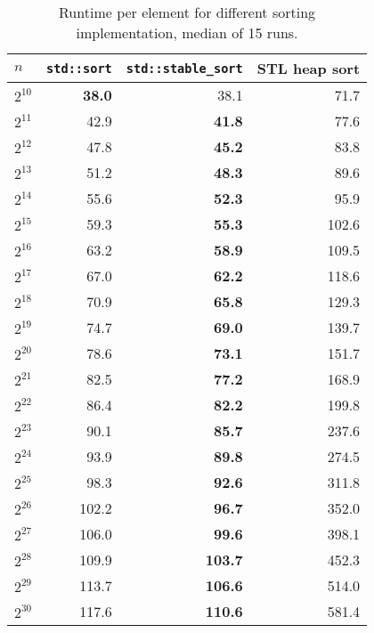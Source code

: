 \documentclass{article}
\begin{document}
\begin{table}\centering
\begin{tabular}{l|rrr}
$n$ & \texttt{std::sort} & \texttt{std::stable\_sort} & STL heap sort \\ \hline
$2^{10}$ & \bf 38.0 &      38.1 &  71.7 \\
$2^{11}$ &     42.9 &  \bf 41.8 &  77.6 \\
$2^{12}$ &     47.8 &  \bf 45.2 &  83.8 \\
$2^{13}$ &     51.2 &  \bf 48.3 &  89.6 \\
$2^{14}$ &     55.6 &  \bf 52.3 &  95.9 \\
$2^{15}$ &     59.3 &  \bf 55.3 & 102.6 \\
$2^{16}$ &     63.2 &  \bf 58.9 & 109.5 \\
$2^{17}$ &     67.0 &  \bf 62.2 & 118.6 \\
$2^{18}$ &     70.9 &  \bf 65.8 & 129.3 \\
$2^{19}$ &     74.7 &  \bf 69.0 & 139.7 \\
$2^{20}$ &     78.6 &  \bf 73.1 & 151.7 \\
$2^{21}$ &     82.5 &  \bf 77.2 & 168.9 \\
$2^{22}$ &     86.4 &  \bf 82.2 & 199.8 \\
$2^{23}$ &     90.1 &  \bf 85.7 & 237.6 \\
$2^{24}$ &     93.9 &  \bf 89.8 & 274.5 \\
$2^{25}$ &     98.3 &  \bf 92.6 & 311.8 \\
$2^{26}$ &    102.2 &  \bf 96.7 & 352.0 \\
$2^{27}$ &    106.0 &  \bf 99.6 & 398.1 \\
$2^{28}$ &    109.9 & \bf 103.7 & 452.3 \\
$2^{29}$ &    113.7 & \bf 106.6 & 514.0 \\
$2^{30}$ &    117.6 & \bf 110.6 & 581.4 \\
\end{tabular}
\caption{Runtime per element for different sorting implementation, median of 15 runs.}
\end{table}

\begin{comment}
+-------+-------------+
| count |         sum |
+-------+-------------+
|   945 | 25661.41392 |
+-------+-------------+
\end{comment}
\end{document}
